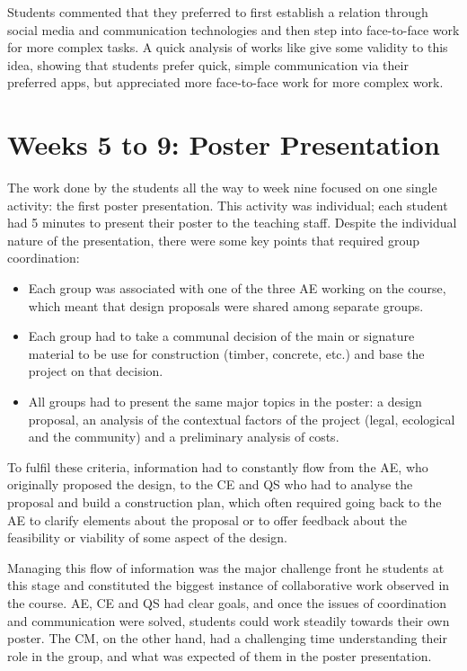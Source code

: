 Students commented that they preferred to first establish a relation through social media and communication technologies and then step into face-to-face work for more
complex tasks. A quick analysis of works like \textcite{an_2006,robinson_2012} give some validity to this idea, showing that students prefer quick, simple communication
via their preferred apps, but appreciated more face-to-face work for more complex work.

\section{Weeks 5 to 9: Poster Presentation \label{sec:6-5}}

The work done by the students all the way to week nine focused on one single activity: the first poster presentation. This activity was individual; each student had 5
minutes to present their poster to the teaching staff. Despite the individual nature of the presentation, there were some key points that required group coordination:

\begin{itemize}
    \item Each group was associated with one of the three \ac{AE} working on the course, which meant that design proposals were shared among separate groups.
    \item Each group had to take a communal decision of the main or signature material to be use for construction (timber, concrete, etc.) and base the project on that
    decision.
    \item All groups had to present the same major topics in the poster: a design proposal, an analysis of the contextual factors of the project (legal, ecological and the
    community) and a preliminary analysis of costs.
\end{itemize}

To fulfil these criteria, information had to constantly flow from the \ac{AE}, who originally proposed the design, to the \ac{CE} and \ac{QS} who had to analyse the
proposal and build a construction plan, which often required going back to the \ac{AE} to clarify elements about the proposal or to offer feedback about the feasibility or
viability of some aspect of the design.

Managing this flow of information was the major challenge front he students at this stage and constituted the biggest instance of collaborative work observed in the course.
\ac{AE}, \ac{CE} and \ac{QS} had clear goals, and once the issues of coordination and communication were solved, students could work steadily towards their own poster. The
\ac{CM}, on the other hand, had a challenging time understanding their role in the group, and what was expected of them in the poster presentation.


